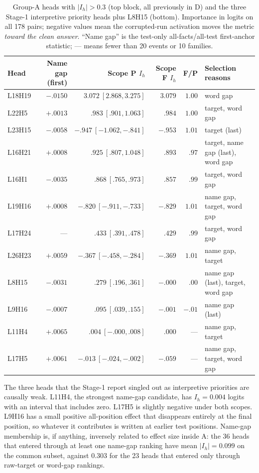 \documentclass[11pt,a4paper]{article}
\begin{document}
\begin{table}[ht]
\centering
\small
\begin{tabular}{lrrrrl}
\toprule
Head & Name gap (first) & Scope P $I_h$ & Scope F $I_h$ & F/P & Selection reasons \\
\midrule
L18H19 & $-.0150$ & $3.072\ [2.868,3.275]$ & $3.079$ & $1.00$ & word gap \\
L22H5  & $+.0013$ & $.983\ [.901,1.063]$ & $.984$ & $1.00$ & target, word gap \\
L23H15 & $-.0058$ & $-.947\ [-1.062,-.841]$ & $-.953$ & $1.01$ & target (last) \\
L16H21 & $+.0008$ & $.925\ [.807,1.048]$ & $.893$ & $.97$ & target, name gap (last), word gap \\
L16H1  & $-.0035$ & $.868\ [.765,.973]$ & $.857$ & $.99$ & target, word gap \\
L19H16 & $+.0008$ & $-.820\ [-.911,-.733]$ & $-.829$ & $1.01$ & name gap, target, word gap \\
L17H24 & --- & $.433\ [.391,.478]$ & $.429$ & $.99$ & target, word gap \\
L26H23 & $+.0059$ & $-.367\ [-.458,-.284]$ & $-.369$ & $1.01$ & name gap, target \\
\midrule
L8H15  & $-.0031$ & $.279\ [.196,.361]$ & $-.000$ & $.00$ & name gap (last), target, word gap \\
L9H16  & $-.0007$ & $.095\ [.039,.155]$ & $-.001$ & $-.01$ & name gap (last) \\
L11H4  & $+.0065$ & $.004\ [-.000,.008]$ & $.000$ & --- & name gap, target \\
L17H5  & $+.0061$ & $-.013\ [-.024,-.002]$ & $-.059$ & --- & name gap, target, word gap \\
\bottomrule
\end{tabular}
\caption{Group-A heads with $|I_h|>0.3$ (top block, all previously in D) and
the three Stage-1 interpretive priority heads plus L8H15 (bottom). Importance in
logits on all 178 pairs; negative values mean the corrupted-run activation moves
the metric \emph{toward the clean answer}. ``Name gap'' is the test-only
all-facts/all-test first-anchor statistic; --- means fewer than 20 events or 10
families.}
\label{tab:A}
\end{table}

The three heads that the Stage-1 report singled out as interpretive priorities
are causally weak. L11H4, the strongest name-gap candidate, has
$I_h=0.004$ logits with an interval that includes zero. L17H5 is slightly
negative under both scopes. L9H16 has a small positive all-position effect that
disappears entirely at the final position, so whatever it contributes is written
at earlier test positions. Name-gap membership is, if anything, inversely
related to effect size inside A: the 36 heads that entered through at least one
name-gap ranking have mean $|I_h|=0.099$ on the common subset, against $0.303$
for the 23 heads that entered only through raw-target or word-gap rankings.
\end{document}
